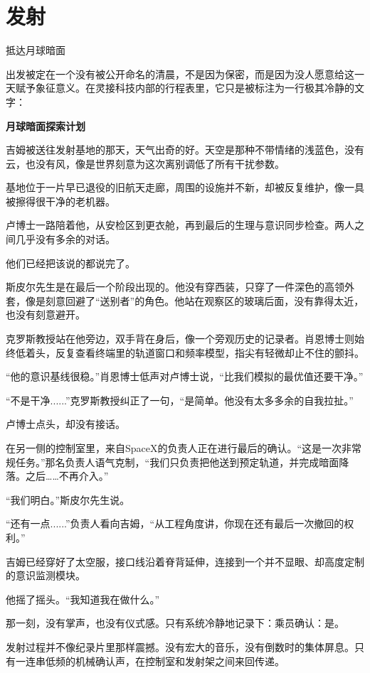 \chapter{发射}

抵达月球暗面

出发被定在一个没有被公开命名的清晨，不是因为保密，而是因为没人愿意给这一天赋予象征意义。在灵接科技内部的行程表里，它只是被标注为一行极其冷静的文字：

\begin{center}
\textbf{月球暗面探索计划}
\end{center}

吉姆被送往发射基地的那天，天气出奇的好。天空是那种不带情绪的浅蓝色，没有云，也没有风，像是世界刻意为这次离别调低了所有干扰参数。

基地位于一片早已退役的旧航天走廊，周围的设施并不新，却被反复维护，像一具被擦得很干净的老机器。

卢博士一路陪着他，从安检区到更衣舱，再到最后的生理与意识同步检查。两人之间几乎没有多余的对话。

他们已经把该说的都说完了。

斯皮尔先生是在最后一个阶段出现的。他没有穿西装，只穿了一件深色的高领外套，像是刻意回避了“送别者”的角色。他站在观察区的玻璃后面，没有靠得太近，也没有刻意避开。

克罗斯教授站在他旁边，双手背在身后，像一个旁观历史的记录者。肖恩博士则始终低着头，反复查看终端里的轨道窗口和频率模型，指尖有轻微却止不住的颤抖。

“他的意识基线很稳。”肖恩博士低声对卢博士说，“比我们模拟的最优值还要干净。”

“不是干净......”克罗斯教授纠正了一句，“是简单。他没有太多多余的自我拉扯。”

卢博士点头，却没有接话。

在另一侧的控制室里，来自SpaceX的负责人正在进行最后的确认。“这是一次非常规任务。”那名负责人语气克制，“我们只负责把他送到预定轨道，并完成暗面降落。之后……不再介入。”

“我们明白。”斯皮尔先生说。

“还有一点......”负责人看向吉姆，“从工程角度讲，你现在还有最后一次撤回的权利。”

吉姆已经穿好了太空服，接口线沿着脊背延伸，连接到一个并不显眼、却高度定制的意识监测模块。

他摇了摇头。“我知道我在做什么。”

那一刻，没有掌声，也没有仪式感。只有系统冷静地记录下：乘员确认：是。

\SceneBreak

发射过程并不像纪录片里那样震撼。没有宏大的音乐，没有倒数时的集体屏息。只有一连串低频的机械确认声，在控制室和发射架之间来回传递。

